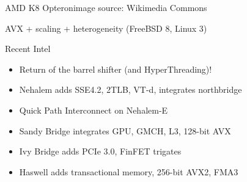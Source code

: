 \documentclass[mathserif,xcolor={dvipsnames,table}]{beamer}
\begin{document}
{
%
\begin{frame}{AMD K8 Opteron\hfill\tiny{image source: Wikimedia Commons}}
\end{frame}
}

\begin{frame}[t]{AVX + scaling + heterogeneity (FreeBSD 8, Linux 3)}
\begin{block}{Recent Intel}
\begin{itemize}
\item Return of the barrel shifter (and HyperThreading)!
\item Nehalem adds SSE4.2, 2TLB, VT-d, integrates northbridge
\item Quick Path Interconnect on Nehalem-E
\item Sandy Bridge integrates GPU, GMCH, L3, 128-bit AVX
\item Ivy Bridge adds PCIe 3.0, FinFET trigates
\item Haswell adds transactional memory, 256-bit AVX2, FMA3
\end{itemize}
\end{block}
\vfill
\begin{center}
\end{center}
\end{frame}
\end{document}
